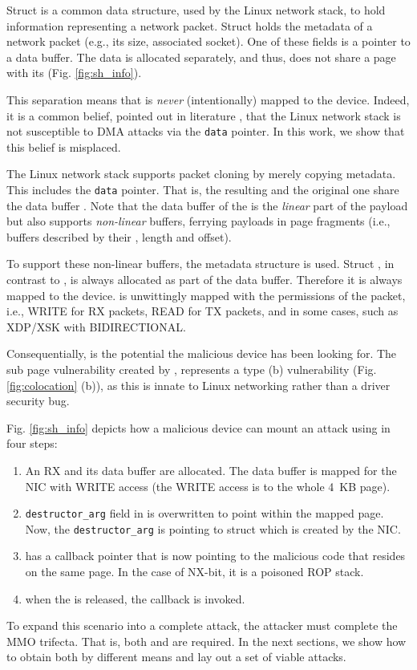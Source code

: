 Struct \skb{} is a common data structure, used by the Linux network stack, to hold information representing a network packet. Struct \skb{} holds the metadata of a network packet (e.g., its size, associated socket). One of these fields is a pointer to a data buffer. The data is allocated separately, and thus, does not share a page with its \skb{} (Fig. \ref{fig:sh_info}). 

This separation means that \skb{} is \emph{never} (intentionally) mapped to the device. Indeed, it is a common belief, pointed out in literature \cite{thunder}, that the Linux network stack is not susceptible to DMA attacks via the \texttt{data} pointer. In this work, we show that this belief is misplaced.

The Linux network stack supports packet cloning by merely copying \skb{} metadata. This includes the \texttt{data} pointer. That is, the resulting \skb{} and the original one share the data buffer \cite{drivers2005linux}. Note that the data buffer of the \skb{} is the \emph{linear} part of the payload but \skb{} also supports \emph{non-linear} buffers, ferrying payloads in page fragments (i.e., buffers described by their \page{}, length and offset). 

To support these non-linear buffers, the \shinfo{} metadata structure is used.
Struct \shinfo{}, in contrast to \skb{}, is always allocated as part of the data buffer. Therefore it is always mapped to the device. \shinfo is unwittingly mapped with the permissions of the packet, i.e., WRITE for RX packets, READ for TX packets, and in some cases, such as XDP/XSK \cite{xdp} with BIDIRECTIONAL.

Consequentially, \shinfo{} is the potential \oportunity{} the malicious device has been looking for. The sub page vulnerability created by \shinfo{}, represents a type (b) vulnerability (Fig. \ref{fig:colocation} (b)), as this is innate to Linux networking rather than a driver security bug. 

Fig. \ref{fig:sh_info} depicts how a malicious device can mount an attack using \shinfo{} in four steps:
\begin{enumerate}[label=(\alph*)]
    \item An RX \skb{} and its data buffer are allocated. The data buffer is mapped for the NIC with WRITE access (the WRITE access is to the whole 4~KB page). 
    \item \texttt{destructor\_arg} field in \shinfo{} is overwritten to point within the mapped page. Now, the \texttt{destructor\_arg} is pointing to struct \uarg{} which is created by the NIC.
    \item \uarg{} has a callback pointer that is now pointing to the malicious code that resides on the same page. In the case of NX-bit, it is a poisoned ROP stack.
    \item when the \skb{} is released, the callback is invoked.
\end{enumerate}
To expand this scenario into a complete attack, the attacker must complete the MMO trifecta. That is, both \means{} and \oportunity{} are required. In the next sections, we show how to obtain both by different means and lay out a set of viable attacks.

